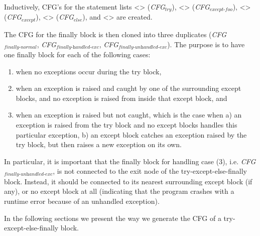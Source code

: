 \begin{sloppypar}
  Inductively, CFG's for the statement lists <> (\textit{CFG$_{\textit{try}}$}), 
  <> (\textit{CFG$_{\textit{except-foo}}$}), <> (\textit{CFG$_{\textit{except}}$}), 
  <> (\textit{CFG$_{\textit{else}}$}), and <> are created. 
\end{sloppypar}

The CFG for the finally block is then cloned into three duplicates (\textit{CFG$_{\textit{finally-normal}}$}, 
\textit{CFG$_{\textit{finally-handled-exc}}$}, \textit{CFG$_{\textit{finally-unhandled-exc}}$}). The purpose is to have one finally block for each of the following cases: 

\begin{enumerate}
  \item when no exceptions occur during the try block,
  \item when an exception is raised and caught by one of the surrounding except blocks, and no exception is raised from inside that except block, and
  \item when an exception is raised but not caught, which is the case when 
    a) an exception is raised from the try block and no except blocks handles this particular exception, 
    b) an except block catches an exception raised by the try block, but then raises a new exception on its own.
\end{enumerate}

\begin{sloppypar}
  In particular, it is important that the finally block for handling case (3), i.e. \textit{CFG$_{\textit{finally-unhandled-exc}}$}, 
  is not connected to the exit node of the try-except-else-finally block. Instead, it should be connected to its nearest surrounding except block (if any), 
  or no except block at all (indicating that the program crashes with a runtime error because of an unhandled exception).
\end{sloppypar}

In the following sections we present the way we generate the CFG of a try-except-else-finally block.



